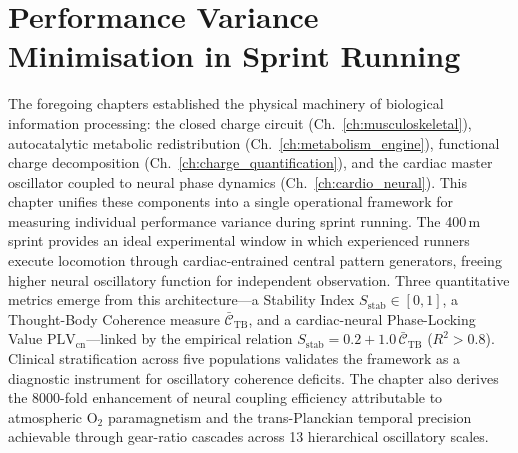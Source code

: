 \providecommand{\Sstab}{S_{\mathrm{stab}}}
\providecommand{\CTB}{\bar{\mathcal{C}}_{\mathrm{TB}}}
\providecommand{\PLVcn}{\mathrm{PLV}_{\mathrm{cn}}}
\providecommand{\tauR}{\tau_{\mathrm{restore}}}
\providecommand{\kappaON}{\kappa_{\mathrm{O_2\text{-}n}}}
\providecommand{\kON}{\kappa_{\mathrm{O_2\text{-}n}}}
\providecommand{\kappaAN}{\kappa_{\mathrm{anaerobic}}}
\providecommand{\calT}{\mathcal{T}}
\providecommand{\calC}{\mathcal{C}}
\providecommand{\calI}{\mathcal{I}}
\providecommand{\calP}{\mathcal{P}}
\providecommand{\Tform}{\tau_{\mathrm{form}}}
\providecommand{\OID}{\mathrm{OID}}
\providecommand{\phiC}{\phi_C}
\providecommand{\phiL}{\phi_L}
\providecommand{\phiTh}{\phi_{\mathrm{th}}}
\providecommand{\omC}{\omega_C}
\providecommand{\omL}{\omega_L}

\chapter{Performance Variance Minimisation in Sprint Running}
\label{ch:variance_min}


\begin{chapterabstract}
The foregoing chapters established the physical machinery of biological information processing: the closed charge circuit (Ch.~\ref{ch:musculoskeletal}), autocatalytic metabolic redistribution (Ch.~\ref{ch:metabolism_engine}), functional charge decomposition (Ch.~\ref{ch:charge_quantification}), and the cardiac master oscillator coupled to neural phase dynamics (Ch.~\ref{ch:cardio_neural}). This chapter unifies these components into a single operational framework for measuring individual performance variance during sprint running. The 400\,m sprint provides an ideal experimental window in which experienced runners execute locomotion through cardiac-entrained central pattern generators, freeing higher neural oscillatory function for independent observation. Three quantitative metrics emerge from this architecture---a Stability Index $\Sstab \in [0,1]$, a Thought-Body Coherence measure $\CTB$, and a cardiac-neural Phase-Locking Value $\PLVcn$---linked by the empirical relation $\Sstab = 0.2 + 1.0\,\CTB$ ($R^2 > 0.8$). Clinical stratification across five populations validates the framework as a diagnostic instrument for oscillatory coherence deficits. The chapter also derives the 8000-fold enhancement of neural coupling efficiency attributable to atmospheric O$_2$ paramagnetism and the trans-Planckian temporal precision achievable through gear-ratio cascades across 13 hierarchical oscillatory scales.
\end{chapterabstract}

